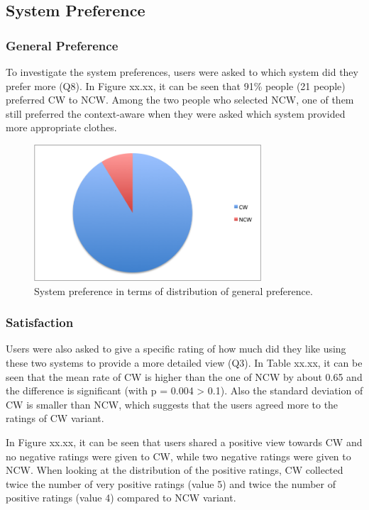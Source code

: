 \subsection{System Preference} \label{sec:results_sp}

\subsubsection{General Preference} \label{sec:results_sp_gp}

To investigate the system preferences, users were asked to which system did they prefer more (Q8). In Figure xx.xx, it can be seen that 91\% people (21 people) preferred CW to NCW. Among the two people who selected NCW, one of them still preferred the context-aware when they were asked which system provided more appropriate clothes.

\begin{figure}[H]
	\centering
	\includegraphics[height=2in]{figures/generalPreference.png}
	\caption{System preference in terms of distribution of general preference.}
	\label{fig:generalPreference}
\end{figure}


\subsubsection{Satisfaction} \label{sec:results_sp_s}

Users were also asked to give a specific rating of how much did they like using these two systems to provide a more detailed view (Q3). In Table xx.xx, it can be seen that the mean rate of CW is higher than the one of NCW by about 0.65 and the difference is significant (with p = 0.004 > 0.1). Also the standard deviation of CW is smaller than NCW, which suggests that the users agreed more to the ratings of CW variant.

In Figure xx.xx, it can be seen that users shared a positive view towards CW and no negative ratings were given to CW, while two negative ratings were given to NCW. When looking at the distribution of the positive ratings, CW collected twice the number of very positive ratings (value 5) and twice the number of positive ratings (value 4) compared to NCW variant. 

